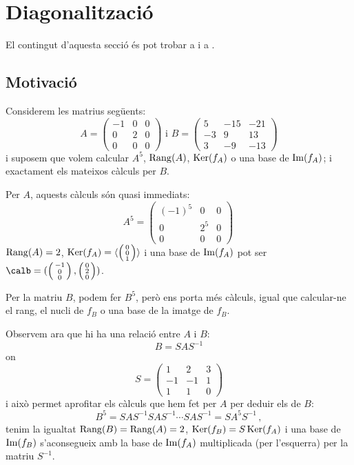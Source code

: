\section{Diagonalització}
El contingut d'aquesta secció és pot trobar a \cite[Temes 6, 7]{Bret} i a \cite[Tema 4]{NaXa}.
\subsection{Motivació}\label{subsec:motiv_diag}
Considerem les matrius següents:
$$
A=\begin{pmatrix}
-1 & 0 & 0 \\ 0 & 2 & 0 \\ 0 & 0 & 0
\end{pmatrix}
\text{ i }
B=\begin{pmatrix}
5 & -15 & -21 \\ -3 & 9 & 13 \\ 3 & -9 & -13
\end{pmatrix}
$$
i suposem que volem calcular $A^5$, $\operatorname{Rang}(A)$, $\operatorname{Ker}(f_A)$ o una base de $\operatorname{Im}(f_A)$; i exactament els mateixos càlculs per $B$.

Per $A$, aquests càlculs són quasi immediats:
$$
A^5=\begin{pmatrix}
(-1)^5 & 0 & 0 \\ 0 & 2^5 & 0 \\ 0 & 0 & 0
\end{pmatrix} \,
$$
$\operatorname{Rang}(A)=2$, 
$\operatorname{Ker}(f_A)=\langle \left( \begin{smallmatrix} 0 \\ 0 \\ 1 \end{smallmatrix} \right) \rangle$ i  una base de $\operatorname{Im}(f_A)$ pot ser $\calb=( \left( \begin{smallmatrix} -1 \\ 0 \\ 0 \end{smallmatrix} \right) , \left( \begin{smallmatrix} 0 \\ 2 \\ 0 \end{smallmatrix} \right))$.

Per la matriu $B$, podem fer $B^5$, però ens porta més càlculs, igual que calcular-ne el rang, el nucli de $f_B$ o una base de la imatge de $f_B$.

Observem ara que hi ha una relació entre $A$ i $B$:
$$
B=S A S^{-1}
$$
on 
$$
S=\begin{pmatrix} 1 & 2 & 3 \\ -1 & -1 & 1 \\ 1 & 1 & 0
\end{pmatrix}
$$
i això permet aprofitar els càlculs que hem fet per $A$ per deduir els de $B$:
$$
B^5=S A S^{-1} S A S^{-1} \cdots S A S^{-1}=S A^5 S^{-1} \, ,
$$
tenim la igualtat $\operatorname{Rang}(B)=\operatorname{Rang}(A)=2$, $\operatorname{Ker}(f_B)=S\operatorname{Ker}(f_A)$ i una base de $\operatorname{Im}(f_B)$ s'aconsegueix amb la base de $\operatorname{Im}(f_A)$ multiplicada (per l'esquerra) per la matriu $S^{-1}$.

